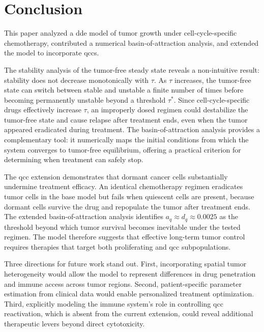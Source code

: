 \section{Conclusion}
\label{sec:conclusion}

This paper analyzed a \gls{dde} model of tumor growth under cell-cycle-specific
chemotherapy, contributed a numerical basin-of-attraction analysis, and extended the
model to incorporate \gls{qcc}s.

The stability analysis of the tumor-free steady state reveals a non-intuitive result: stability does not decrease monotonically with $\tau$. As $\tau$ increases, the tumor-free state can switch between stable and unstable a finite number of times before becoming permanently unstable beyond a threshold $\tau^*$. Since cell-cycle-specific drugs effectively increase $\tau$, an improperly dosed regimen could destabilize the tumor-free state and cause relapse after treatment ends, even when the tumor appeared eradicated during treatment. The basin-of-attraction analysis provides a complementary tool: it numerically maps the initial conditions from which the system converges to tumor-free equilibrium, offering a practical criterion for determining when treatment can safely stop.

The \gls{qcc} extension demonstrates that dormant cancer cells substantially undermine treatment efficacy. An identical chemotherapy regimen eradicates tumor cells in the base model but fails when quiescent cells are present, because dormant cells survive the drug and repopulate the tumor after treatment ends. The extended basin-of-attraction analysis identifies $a_q \approx d_q \approx 0.0025$ as the threshold beyond which tumor survival becomes inevitable under the tested regimen. The model therefore suggests that effective long-term tumor control requires therapies that target both proliferating and \gls{qcc} subpopulations.

Three directions for future work stand out. First, incorporating spatial tumor heterogeneity would allow the model to represent differences in drug penetration and immune access across tumor regions. Second, patient-specific parameter estimation from clinical data would enable personalized treatment optimization. Third, explicitly modeling the immune system's role in controlling \gls{qcc} reactivation, which is absent from the current extension, could reveal additional therapeutic levers beyond direct cytotoxicity.
